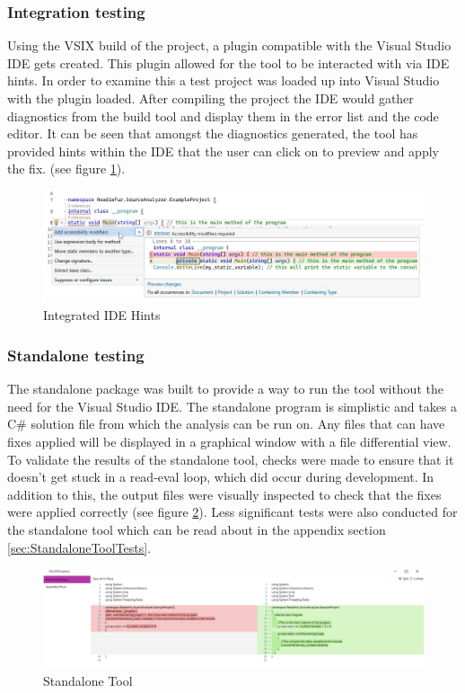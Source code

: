 \subsubsection{Integration testing}
Using the VSIX build of the project, a plugin compatible with the Visual Studio IDE gets created. This plugin allowed for the tool to be interacted with via IDE hints. In order to examine this a test project was loaded up into Visual Studio with the plugin loaded. After compiling the project the IDE would gather diagnostics from the build tool and display them in the error list and the code editor. It can be seen that amongst the diagnostics generated, the tool has provided hints within the IDE that the user can click on to preview and apply the fix. (see figure \ref{fig:IDEHints}).

\begin{figure}[H]
    \vspace{-10px}
    \centering
    \caption{Integrated IDE Hints}
    \label{fig:IDEHints}
    \includegraphics[width=\textwidth]{Figures/IDEHintsCropped.png}
\end{figure}

\subsubsection{Standalone testing}
The standalone package was built to provide a way to run the tool without the need for the Visual Studio IDE. The standalone program is simplistic and takes a C\# solution file from which the analysis can be run on. Any files that can have fixes applied will be displayed in a graphical window with a file differential view. To validate the results of the standalone tool, checks were made to ensure that it doesn't get stuck in a read-eval loop, which did occur during development. In addition to this, the output files were visually inspected to check that the fixes were applied correctly (see figure \ref{fig:StandaloneTool}). Less significant tests were also conducted for the standalone tool which can be read about in the appendix section \ref{sec:StandaloneToolTests}.

\begin{figure}[H]
    \centering
    \caption{Standalone Tool}
    \label{fig:StandaloneTool}
    \includegraphics[width=\textwidth]{Figures/StandaloneToolCropped.png}
\end{figure}
